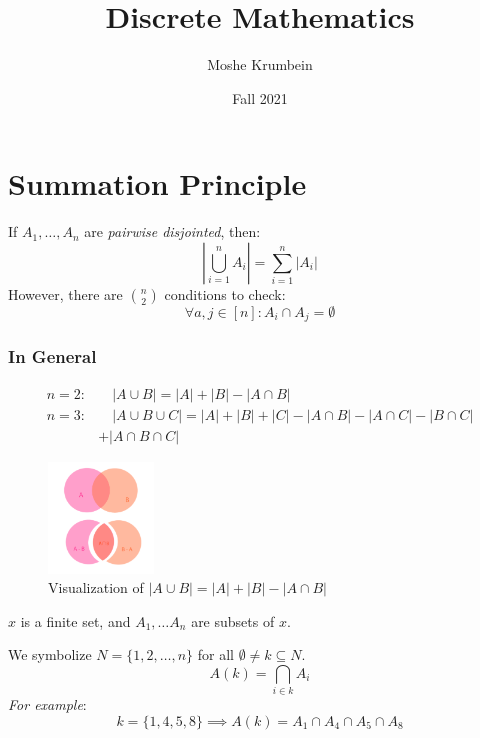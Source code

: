 \documentclass[00_complete]{subfiles}
\title{Discrete Mathematics}
\author{Moshe Krumbein}
\date{Fall 2021}
\begin{document}

\section{Summation Principle}

\begin{theorem}
    If $A_1,\dots,A_n$ are \emph{pairwise disjointed}, then:
    $$\left|\bigcup_{i=1}^nA_i\right| = \sum_{i=1}^{n}|A_i|$$
    However, there are $\binom{n}{2}$ conditions to check:
    $$\forall a,j \in [n]: A_i \cap A_j = \emptyset$$
\end{theorem}

\subsubsection{In General}

$$
\begin{aligned}
    n=2:& \quad|A \cup B| = |A| + |B| - |A \cap B| \\
    n=3:& \quad|A \cup B \cup C| = |A| + |B| + |C| - |A \cap B| - |A \cap C| - |B \cap
C| \\&+ |A \cap B \cap C|
\end{aligned}$$

\begin{figure}[ht]
  \centering
    \includegraphics[width=0.25\textwidth]{w7_venn1}
    \caption{Visualization of $|A \cup B| = |A| + |B| - |A \cap B|$}
\end{figure}

\begin{symbols}
    $x$ is a finite set, and $A_1,\dots A_n$ are subsets of $x$.

    We symbolize $N=\{1,2,\dots,n\}$ for all $\emptyset \neq k \subseteq N$.
    $$A(k) = \bigcap_{i \in k}A_i$$
    \emph{For example}:
    $$k = \{1,4,5,8\} \implies A(k) = A_1 \cap A_4 \cap A_5 \cap A_8$$
\end{symbols}
\end{document}
